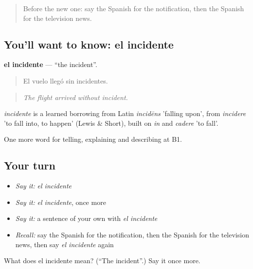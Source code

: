 \label{lesson:ES-C574-incidente}



\begin{quote}
Before the new one: say the Spanish for the notification, then the Spanish for the television news.
\end{quote}

\subsection*{You'll want to know: el incidente}
\textbf{el incidente} — \textquotedblleft{}the incident\textquotedblright{}.

\begin{quote}
El vuelo llegó sin incidentes.
\end{quote}

\begin{quote}
\emph{The flight arrived without incident.}
\end{quote}

\begin{cousinweb}
\emph{incidente} is a learned borrowing from Latin \emph{incidēns} 'falling upon', from \emph{incidere} 'to fall into, to happen' (Lewis \& Short), built on \emph{in} and \emph{cadere} 'to fall'.
\end{cousinweb}

\begin{grammarlens}[title={What you've built}]
One more word for telling, explaining and describing at B1.
\end{grammarlens}

\subsection*{Your turn}
\begin{itemize}
\raggedright
  \item \emph{Say it:} \emph{el incidente}
  \item \emph{Say it:} \emph{el incidente}, once more
  \item \emph{Say it:} a sentence of your own with \emph{el incidente}
  \item \emph{Recall:} say the Spanish for the notification, then the Spanish for the television news, then say \emph{el incidente} again
\end{itemize}

\begin{tcolorbox}[breakable,colback=teal!4,colframe=teal!35!black,title={Before you move on}]
What does el incidente mean? (\textquotedblleft{}The incident\textquotedblright{}.) Say it once more.
\end{tcolorbox}
